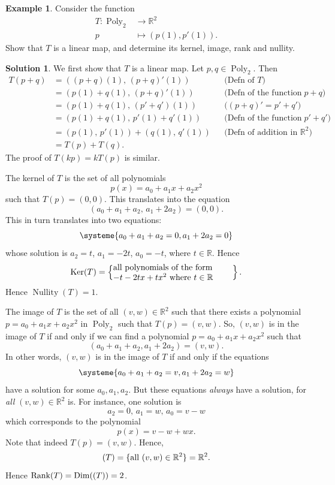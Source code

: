 \documentclass[a4paper,11pt]{book}
\theoremstyle{definition}
\newtheorem{example_environment}{Example}[chapter]
\newtheorem*{solution}{Solution}
\newenvironment{example}
	{
		\begin{oframed} 
		\begin{example_environment}
	}
	{
		\end{example_environment}
		\end{oframed}
	}
\DeclareMathOperator{\Poly}{Poly}
\DeclareMathOperator{\Dim}{Dim}
\DeclareMathOperator{\Ker}{Ker}
\DeclareMathOperator{\Nullity}{Nullity}
\DeclareMathOperator{\Rank}{Rank}
\let\Im\relax
\DeclareMathOperator{\Im}{Im} %
\begin{document}
\begin{example} Consider the function
\begin{align*}
 T : \Poly_2 & \rightarrow \mathbb{R}^2 \\
 p & \mapsto (p(1), p'(1)).
\end{align*}
Show that $T$ is a linear map, and determine its kernel, image, rank and nullity.
\begin{solution} We first show that $T$ is a linear map. Let $p,q \in \Poly_2$. Then
\begin{align*}
 T(p + q) &= ( (p+q)(1), \, (p+q)'(1) )  && \mbox{(Defn of $T$)} \\
 &= (p(1) + q(1), \, (p+q)'(1) ) && \mbox{(Defn of the function $p+q$)} \\
 &= (p(1) + q(1), \, (p'+q')(1) ) && \mbox{($(p+q)' = p'+q'$)} \\
 &= (p(1) + q(1), \, p'(1) + q'(1)) && \mbox{(Defn of the function $p' + q'$)} \\
 &= (p(1), \, p'(1)) + (q(1), \, q'(1)) && \mbox{(Defn of addition in $\mathbb{R}^2$)} \\
 &= T(p) + T(q).
\end{align*}
The proof of $T(kp) = kT(p)$ is similar.

The kernel of $T$ is the set of all polynomials
\[
 p(x) = a_0 + a_1 x + a_2 x^2
\]
such that $T(p) = (0,0)$. This translates into the equation
\[
 (a_0 + a_1 + a_2, \, a_1 + 2 a_2) = (0,0).
\]
This in turn translates into two equations:
\[
 \systeme{ a_0 + a_1 + a_2 = 0, a_1 + 2a_2 = 0}
\]
whose solution is $a_2 = t$, $a_1 = - 2t$, $a_0 = -t$, where $t \in \mathbb{R}$. Hence
\[
 \Ker(T) =  \left\{ \mbox{\begin{minipage}{5cm} all polynomials of the form  \\ $ -t -2t x + t x^2$  where  $t \in \mathbb{R}$ \end{minipage}} \right\}.
\]
Hence $\Nullity(T) = 1$.

The image of $T$ is the set of all $(v,w) \in \mathbb{R}^2$ such that there exists a polynomial $p = a_0 + a_1 x + a_2 x^2$ in $\Poly_2$ such that $T(p) = (v,w)$. So, $(v,w)$ is in the image of $T$ if and only if we can find a polynomial $p = a_0 + a_1x + a_2 x^2$ such that
\[
 (a_0 + a_1 + a_2, a_1 + 2a_2) = (v,w).
\]
In other words, $(v,w)$ is in the image of $T$ if and only if the equations
\[
 \systeme{ a_0 + a_1 + a_2 = v, a_1 + 2a_2 = w}
\]
have a solution for some $a_0, a_1, a_2$. But these equations {\em always} have a solution, for {\em all} $(v,w) \in \mathbb{R}^2$ is. For instance, one solution is 
\[
 a_2 = 0 ,  \, a_1 = w, \, a_0 = v - w
\]
which corresponds to the polynomial 
\begin{equation}
\label{one-soln-for-preimage} p(x) = v-w + wx.
\end{equation}
Note that indeed $T(p) = (v,w)$. Hence,
\[
 \Im(T) = \{\mbox{all } (v,w) \in \mathbb{R}^2 \} = \mathbb{R}^2.
\] 
Hence $\Rank (T) = \Dim (\Im(T)) = 2$.


\end{solution}
\end{example}
\end{document}
